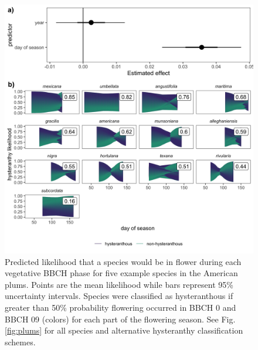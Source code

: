 \documentclass{article}[12pt]
\begin{document}
{\begin{figure}[h!]
    \centering
 \includegraphics[width=\textwidth]{..//..//Plots/whatReviwerswant/sps_preds.jpeg}
    \caption{Predicted likelihood that a species would be in flower during each vegetative BBCH phase for five example species in the American plums. Points are the mean likelihood while bars represent 95\% uncertainty intervals. Species were classified as hysteranthous if greater than 50\% probability flowering occurred in BBCH 0 and BBCH 09 (colors) for each part of the flowering season.
  See Fig. \ref{fig:plums} for all species and alternative hysteranthy classification schemes. }
    \label{fig:ordinals}
\end{figure}




}
\end{document}
